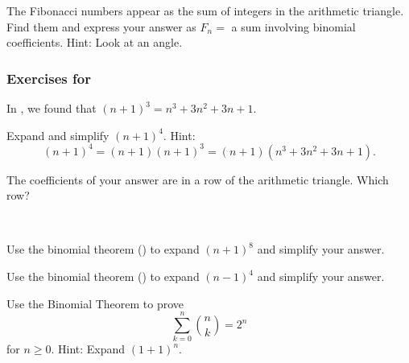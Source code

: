 \begin{exer}[\exerE] %
\label{exer_fib_sum_in_arith_tri}
    The Fibonacci numbers appear as the sum of integers in the arithmetic triangle.  Find them and express your answer as $F_n=$ a sum involving binomial coefficients.  Hint: Look at an angle.
\end{exer}


\subsubsection*{Exercises for  \subbinomthm}

\begin{exer}[\exerP] %
\label{exer_expand_nplus1_tothe4}
    In , we found that $(n+1)^3=n^3+3n^2+3n+1$.  
        \begin{exerpart}
            \item Expand and simplify $(n+1)^4$.  Hint: $$(n+1)^4=(n+1)(n+1)^3=(n+1)(n^3+3n^2+3n+1).$$
            \item The coefficients of your answer are in a row of the arithmetic triangle. Which row?
        \end{exerpart}
\end{exer}

\begin{exer}[\exerP] %
\label{exer_binom_thm}
~
    \begin{exerpart}
        \item Use the binomial theorem () to expand $(n+1)^8$ and simplify your answer. 
        \item Use the binomial theorem () to expand $(n-1)^4$ and simplify your answer.
    \end{exerpart}
\end{exer}


\begin{exer}[\exerU] %
\label{exer_bin_thm_proof_row_sum_pascal}
    Use the Binomial Theorem to prove $$ \sum_{k=0}^n \binom{n}{k} = 2^n$$ for $n \ge 0$.  Hint:  Expand $(1+1)^n$.    
\end{exer}

